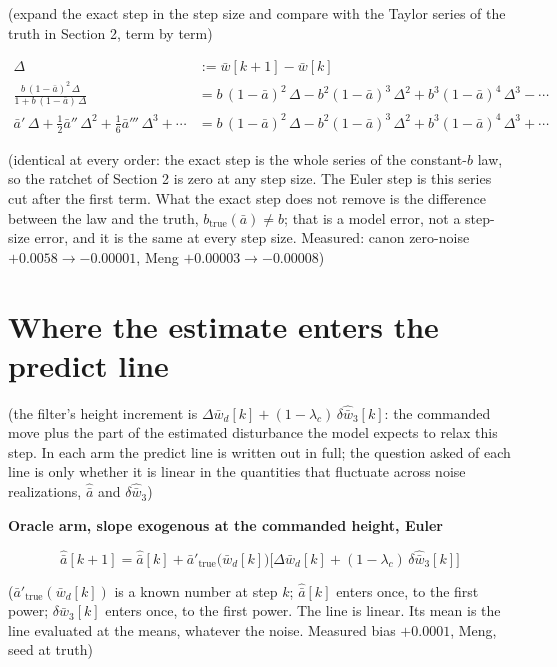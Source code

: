 \documentclass[11pt,a4paper,fontset=none]{ctexart}
\newcommand{\ba}{\bar{a}}
\newcommand{\bw}{\bar{w}}
\begin{document}
(expand the exact step in the step size and compare with the Taylor series of
the truth in Section 2, term by term)

\begin{align*}
\Delta &:= \bw[k+1]-\bw[k] \\
\frac{b\,(1-\ba)^{2}\,\Delta}{1 + b\,(1-\ba)\,\Delta}
  &= b\,(1-\ba)^{2}\,\Delta
   - b^{2}(1-\ba)^{3}\,\Delta^{2}
   + b^{3}(1-\ba)^{4}\,\Delta^{3}
   - \cdots \\
\ba'\,\Delta + \tfrac{1}{2}\ba''\,\Delta^{2} + \tfrac{1}{6}\ba'''\,\Delta^{3} + \cdots
  &= b\,(1-\ba)^{2}\,\Delta
   - b^{2}(1-\ba)^{3}\,\Delta^{2}
   + b^{3}(1-\ba)^{4}\,\Delta^{3}
   + \cdots
\end{align*}

(identical at every order: the exact step is the whole series of the
constant-$b$ law, so the ratchet of Section 2 is zero at any step size.
The Euler step is this series cut after the first term. What the exact step
does not remove is the difference between the law and the truth,
$b_{\mathrm{true}}(\ba) \ne b$; that is a model error, not a step-size error,
and it is the same at every step size. Measured: canon zero-noise
$+0.0058 \to -0.00001$, Meng $+0.00003 \to -0.00008$)

\section{Where the estimate enters the predict line}

(the filter's height increment is
$\Delta\bw_d[k] + (1-\lambda_c)\,\delta\hat{\bw}_3[k]$:
the commanded move plus the part of the estimated disturbance the model expects
to relax this step. In each arm the predict line is written out in full; the
question asked of each line is only whether it is linear in the quantities that
fluctuate across noise realizations, $\hat{\ba}$ and $\delta\hat{\bw}_3$)

\textbf{Oracle arm, slope exogenous at the commanded height, Euler}

\begin{equation*}
\hat{\ba}[k+1] = \hat{\ba}[k]
  + \ba'_{\mathrm{true}}\bigl(\bw_d[k]\bigr)
    \bigl[\Delta\bw_d[k] + (1-\lambda_c)\,\delta\hat{\bw}_3[k]\bigr]
\end{equation*}

($\ba'_{\mathrm{true}}(\bw_d[k])$ is a known number at step $k$;
$\hat{\ba}[k]$ enters once, to the first power; $\delta\hat{\bw}_3[k]$ enters
once, to the first power. The line is linear. Its mean is the line evaluated at
the means, whatever the noise. Measured bias $+0.0001$, Meng, seed at truth)
\end{document}
